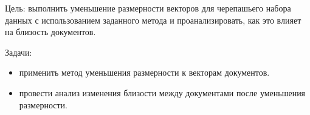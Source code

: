 

Цель: выполнить уменьшение размерности векторов для черепашьего набора данных с использованием заданного метода и проанализировать, как это влияет на близость документов.

Задачи:
\begin{itemize}
    \item применить метод уменьшения размерности к векторам документов.
    \item провести анализ изменения близости между документами после уменьшения размерности.
\end{itemize}

\clearpage

